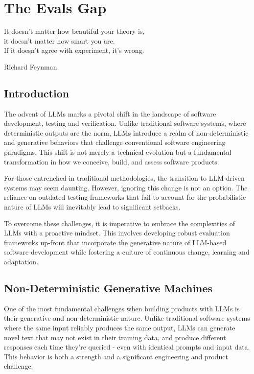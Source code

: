 \setchapterpreamble[u]{\margintoc}

\chapter{The Evals Gap}

\epigraph{It doesn't matter how beautiful your theory is, \\
it doesn't matter how smart you are. \\
If it doesn't agree with experiment, it's wrong.}{Richard Feynman}

\section{Introduction}

The advent of LLMs marks a pivotal shift in the landscape of software development, testing and verification. Unlike traditional software systems, where deterministic outputs are the norm, LLMs introduce a realm of non-deterministic and generative behaviors that challenge conventional software engineering paradigms. This shift is not merely a technical evolution but a fundamental transformation in how we conceive, build, and assess software products.

For those entrenched in traditional methodologies, the transition to LLM-driven systems may seem daunting. However, ignoring this change is not an option. The reliance on outdated testing frameworks that fail to account for the probabilistic nature of LLMs will inevitably lead to significant setbacks.

To overcome these challenges, it is imperative to embrace the complexities of LLMs with a proactive mindset. This involves developing robust evaluation frameworks up-front that incorporate the generative nature of LLM-based software development while fostering a culture of continuous change, learning and adaptation.

\section{Non-Deterministic Generative Machines}

One of the most fundamental challenges when building products with LLMs is their generative and non-deterministic nature. Unlike traditional software systems where the same input reliably produces the same output, LLMs can generate novel text that may not exist in their training data, and produce different responses each time they're queried - even with identical prompts and input data. This behavior is both a strength and a significant engineering and product challenge.

